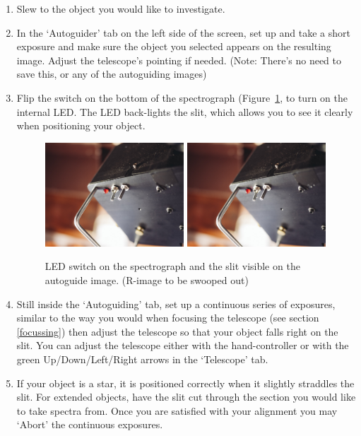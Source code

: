 \documentclass[12pt,twoside,a4paper]{report}
\begin{document}
\begin{enumerate}
 \item Slew to the object you would like to investigate.
 \item In the `Autoguider' tab on the left side of the screen, set up and take a short exposure and make sure the object you selected appears on the resulting image. Adjust the telescope's pointing if needed. (Note: There's no need to save this, or any of the autoguiding images)
 \item Flip the switch on the bottom of the spectrograph (Figure~\ref{fig:internal_LED}, to turn on the internal LED. The LED back-lights the slit, which allows you to see it clearly when positioning your object.

 \begin{figure}[ht]
  \centering
    \includegraphics[width=0.49\textwidth]{documentation_images/internal_LED.jpg}
    \includegraphics[width=0.49\textwidth]{documentation_images/internal_LED.jpg}
    \caption{\label{fig:internal_LED}LED switch on the spectrograph and the slit visible on the autoguide image. (R-image to be swooped out)}
 \end{figure}

 \item Still inside the `Autoguiding' tab, set up a continuous series of exposures, similar to the way you would when focusing the telescope (see section \ref{focussing}) then adjust the telescope so that your object falls right on the slit. You can adjust the telescope either with the hand-controller or with the green Up/Down/Left/Right arrows in the `Telescope' tab.

 \item If your object is a star, it is positioned correctly when it slightly straddles the slit. For extended objects, have the slit cut through the section you would like to take spectra from. Once you are satisfied with your alignment you may `Abort' the continuous exposures.\\

\end{enumerate}
\end{document}
